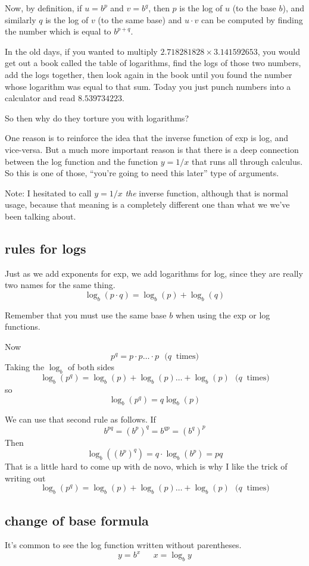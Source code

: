 \documentclass[11pt, oneside]{article}
\begin{document}
Now, by definition, if $u = b^p$ and $v = b^q$, then $p$ is the log of $u$ (to the base $b$), and similarly $q$ is the log of $v$ (to the same base) and $u \cdot v$ can be computed by finding the number which is equal to $b^{p+q}$.

In the old days, if you wanted to multiply $2.718281828 \times 3.141592653$, you would get out a book called the table of logarithms, find the logs of those two numbers, add the logs together, then look again in the book until you found the number whose logarithm was equal to that sum.  Today you just punch numbers into a calculator and read $8.539734223$.

So then why do they torture you with logarithms?

One reason is to reinforce the idea that the inverse function of exp is log, and vice-versa.  But a much more important reason is that there is a deep connection between the log function and the function $y = 1/x$ that runs all through calculus.  So this is one of those, ``you're going to need this later'' type of arguments.

Note:  I hesitated to call $y = 1/x$ \emph{the} inverse function, although that is normal usage, because that meaning is a completely different one than what we we've been talking about.  

\subsection*{rules for logs}

Just as we add exponents for exp, we add logarithms for log, since they are really two names for the same thing.
\[ \log_b(p \cdot q) = \log_b(p) + \log_b(q) \]

Remember that you must use the same base $b$ when using the exp or log functions.

Now
\[ p^q = p \cdot p \dots  \cdot p \ \ \ ( q \ \text{ times)} \]
Taking the $\log_b$ of both sides
\[ \log_b(p^q) = \log_b(p) + \log_b(p) \dots + \log_b(p) \ \ \ ( q \ \text{ times)} \]
so
\[ \log_b(p^q) =  q \log_b(p) \]

We can use that second rule as follows.  If
\[ b^{pq} = (b^p)^q = b^{qp} = (b^q)^p \]
Then 
\[ \log_b((b^p)^q) = q \cdot \log_b(b^p) = pq \]
That is a little hard to come up with de novo, which is why I like the trick of writing out 
\[ \log_b(p^q) = \log_b(p) + \log_b(p) \dots + \log_b(p) \ \ \ ( q \ \text{ times)} \]

\subsection*{change of base formula}
It's common to see the log function written without parentheses.  
\[ y = b^x \ \ \ \ \ \ \ x = \log_b y \]
\end{document}
